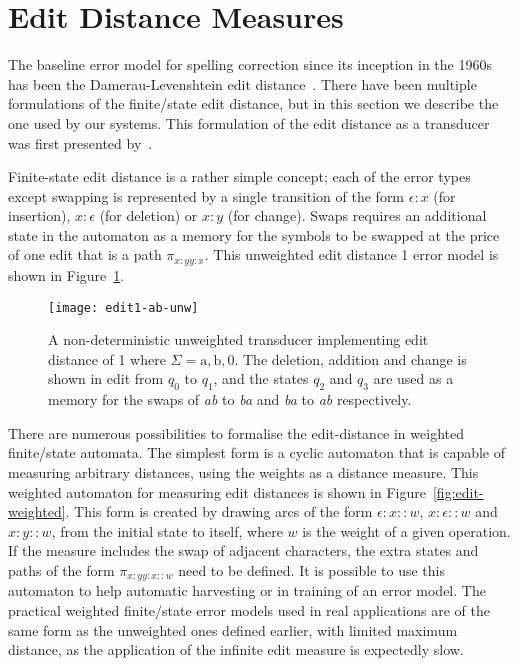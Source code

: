 \documentclass[officiallayout,final]{unihelcompling}
\begin{document}
\section{Edit Distance Measures}
\label{sec:edit-distance}

The baseline error model for spelling correction since its inception in the
1960s has been the Damerau-Levenshtein edit
distance~\citep{damerau1964technique,levenshtein1966binary}. There have been
multiple formulations of the finite\-/state edit distance, but in this section
we describe the one used by our systems. This formulation of the edit distance
as a transducer was first presented by~\citet{schulz2002fast}.

Finite-state edit distance is a rather simple concept; each of the error types
except swapping is represented by a single transition of the form $\epsilon:x$ (for
insertion), $x:\epsilon$ (for deletion) or $x:y$ (for change). Swaps
requires an additional state in the automaton as a memory for the symbols to be
swapped at the price of one edit that is a path $\pi_{x:y y:x}$. This
unweighted edit distance 1 error model is shown in Figure~\ref{fig:edit1-ab}.

\begin{figure}
    \texttt{[image: edit1-ab-unw]}
    \caption{A non-deterministic unweighted transducer implementing
        edit distance of 1 where $\Sigma = {\mathrm{a}, \mathrm{b}, 0}$.
        The deletion, addition and change is shown in
        edit from $q_0$ to $q_1$, and the states $q_2$ and $q_3$ are used as a
        memory for the swaps of \emph{ab} to \emph{ba} and \emph{ba} to
        \emph{ab} respectively.  \label{fig:edit1-ab}}
\end{figure}

There are numerous possibilities to formalise the edit-distance in weighted
finite\-/state automata. The simplest form is a cyclic automaton that is
capable of measuring arbitrary distances, using the weights as a distance
measure. This weighted automaton for measuring edit distances is shown in
Figure~\ref{fig:edit-weighted}. This form is created by drawing arcs of the
form $\epsilon:x::w$, $x:\epsilon::w$ and $x:y::w$, from the initial state to
itself, where $w$ is the weight of a given operation. If the measure includes
the swap of adjacent characters, the extra states and paths of the form
$\pi_{x:y y:x::w}$ need to be defined. It is possible to use this automaton to
help automatic harvesting or in training of an error model. The practical
weighted finite\-/state error models used in real applications are of the same
form as the unweighted ones defined earlier, with limited maximum distance, as
the application of the infinite edit measure is expectedly slow.
\end{document}
